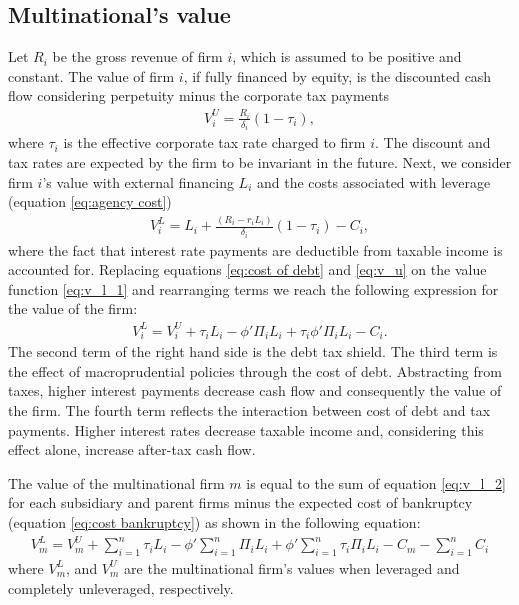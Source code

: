 \documentclass[12pt]{article}
\begin{document}
	\subsection{Multinational's value}
	\label{subsec:value}
	Let $R_i$ be the gross revenue of firm $i$, which is assumed to be positive and constant. The value of firm $i$, if fully financed by equity, is the discounted cash flow considering perpetuity minus the corporate tax payments 
	\begin{equation}
	\begin{aligned}
	V_i^U=\frac{R_i}{\delta_i}(1-\tau_{i}),
	\end{aligned}
	\label{eq:v_u}
	\end{equation}	
	where $\tau_{i}$ is the effective corporate tax rate charged to firm $i$. The discount and tax rates are expected by the firm to be invariant in the future. Next, we consider firm $i$'s value with external financing $L_i$ and the costs associated with leverage (equation \ref{eq:agency cost})
	\begin{equation}
	\begin{aligned}
	V_i^L=L_i+\frac{(R_i-r_iL_i)}{\delta_i}(1-\tau_{i})-C_i,
	\end{aligned}
	\label{eq:v_l_1}
	\end{equation}	
	where the fact that interest rate payments are deductible from taxable income is accounted for. Replacing equations \ref{eq:cost of debt} and \ref{eq:v_u} on the value function \ref{eq:v_l_1} and rearranging terms we reach the following expression for the value of the firm:
	\begin{equation}
	\begin{aligned}
	V_i^L=V_i^U+\tau_{i}L_i-\phi'\Pi_iL_i+\tau_{i}\phi'\Pi_iL_i-C_i.
	\end{aligned}
	\label{eq:v_l_2}
	\end{equation}	
	The second term of the right hand side is the debt tax shield. The third term is the effect of macroprudential policies through the cost of debt. Abstracting from taxes, higher interest payments decrease cash flow and consequently the value of the firm. The fourth term reflects the interaction between cost of debt and tax payments. Higher interest rates decrease taxable income and, considering this effect alone, increase after-tax cash flow.
	
	The value of the multinational firm $m$ is equal to the sum of equation \ref{eq:v_l_2} for each subsidiary and parent firms minus the expected cost of bankruptcy (equation \ref{eq:cost bankruptcy}) as shown in the following equation:
	\begin{equation}
	\begin{aligned}
	V_m^L=V_m^U+\sum_{i=1}^{n}\tau_iL_i-\phi'\sum_{i=1}^{n}\Pi_iL_i+\phi'\sum_{i=1}^{n}\tau_i\Pi_i L_i-C_m-\sum_{i=1}^{n}C_i
	\end{aligned}
	\label{eq:v_l}
	\end{equation}
	where $V_m^L$, and $V_m^U$ are the multinational firm's values when leveraged and completely unleveraged, respectively.
\end{document}
